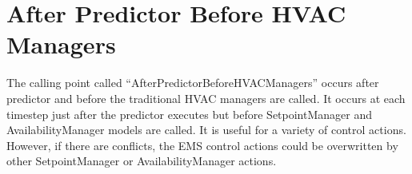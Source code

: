 \section{After Predictor Before HVAC Managers}\label{after-predictor-before-hvac-managers}

The calling point called ``AfterPredictorBeforeHVACManagers'' occurs after predictor and before the traditional HVAC managers are called. It occurs at each timestep just after the predictor executes but before SetpointManager and AvailabilityManager models are called. It is useful for a variety of control actions. However, if there are conflicts, the EMS control actions could be overwritten by other SetpointManager or AvailabilityManager actions.
